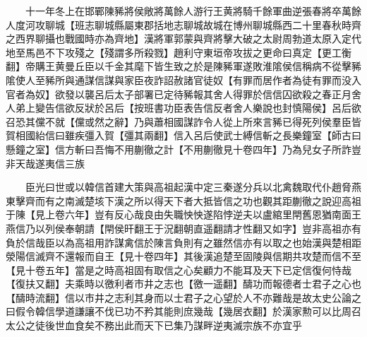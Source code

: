 　　十一年冬上在邯鄲陳豨將侯敞將萬餘人游行王黄將騎千餘軍曲逆張春將卒萬餘人度河攻聊城【班志聊城縣屬東郡括地志聊城故城在博州聊城縣西二十里春秋時齊之西界聊攝也戰國時亦為齊地】漢將軍郭蒙與齊將擊大破之太尉周勃道太原入定代地至馬邑不下攻殘之【殘謂多所殺戮】趙利守東垣帝攻拔之更命曰真定【更工衡翻】帝購王黄曼丘臣以千金其麾下皆生致之於是陳豨軍遂敗淮隂侯信稱病不從擊豨隂使人至豨所與通謀信謀與家臣夜詐詔赦諸官徒奴【有罪而居作者為徒有罪而没入官者為奴】欲發以襲呂后太子部署已定待豨報其舍人得罪於信信囚欲殺之春正月舍人弟上變告信欲反狀於呂后【按班書功臣表告信反者舍人樂說也封慎陽侯】呂后欲召恐其儻不就【儻或然之辭】乃與蕭相國謀詐令人從上所來言豨已得死列侯羣臣皆賀相國紿信曰雖疾彊入賀【彊其兩翻】信入呂后使武士縛信斬之長樂鐘室【師古曰懸鐘之室】信方斬曰吾悔不用蒯徹之計【不用蒯徹見十卷四年】乃為兒女子所詐豈非天哉遂夷信三族

　　臣光曰世或以韓信首建大策與高祖起漢中定三秦遂分兵以北禽魏取代仆趙脅燕東擊齊而有之南滅楚垓下漢之所以得天下者大抵皆信之功也觀其距蒯徹之說迎高祖于陳【見上卷六年】豈有反心哉良由失職怏怏遂陷悖逆夫以盧綰里閈舊恩猶南面王燕信乃以列侯奉朝請【閈侯旰翻王于況翻朝直遥翻請才性翻又如字】豈非高祖亦有負於信哉臣以為高祖用詐謀禽信於陳言負則有之雖然信亦有以取之也始漢與楚相距滎陽信滅齊不還報而自王【見十卷四年】其後漢追楚至固陵與信期共攻楚而信不至【見十卷五年】當是之時高祖固有取信之心矣顧力不能耳及天下已定信復何恃哉【復扶又翻】夫乘時以徼利者市井之志也【徼一遥翻】醻功而報德者士君子之心也【醻時流翻】信以市井之志利其身而以士君子之心望於人不亦難哉是故太史公論之曰假令韓信學道謙讓不伐已功不矜其能則庶幾哉【幾居衣翻】於漢家勲可以比周召太公之徒後世血食矣不務出此而天下已集乃謀畔逆夷滅宗族不亦宜乎

